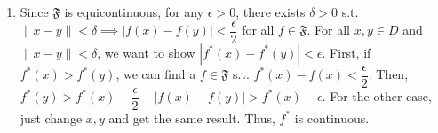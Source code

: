 \documentclass[12pt]{article}
\begin{document}
\begin{enumerate}
    \item Since $\mathfrak{F}$ is equicontinuous, for any $\epsilon > 0$, there exists $\delta > 0$ s.t. $\| x-y\| < \delta \implies |f(x) - f(y)| < \dfrac{\epsilon}{2}$ for all $f\in \mathfrak{F}$.
    For all $x, y\in D$ and $\|x - y\| < \delta$, we want to show $|f^*(x) - f^*(y)| < \epsilon$.
    First, if $f^*(x) > f^*(y)$, we can find a $f\in \mathfrak{F}$ s.t. $f^*(x) - f(x) < \dfrac{\epsilon}{2}$.
    Then, $f^*(y) > f^*(x) - \dfrac{\epsilon}{2} - |f(x) - f(y)| > f^*(x) - \epsilon$.
    For the other case, just change $x, y$ and get the same result.
    Thus, $f^*$ is continuous.
\end{enumerate}
\end{document}

